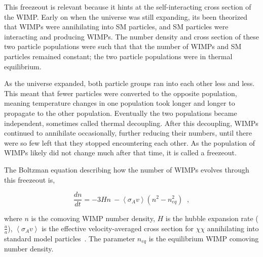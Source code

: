 This freezeout is relevant because it hints at the self-interacting cross section of the WIMP.
Early on when the universe was still expanding, its been theorized that WIMPs were annihilating into SM particles, and SM particles were interacting and producing WIMPs.
The number density and cross section of these two particle populations were such that that the number of WIMPs and SM particles remained constant; the two particle populations were in thermal equilibrium.

As the universe expanded, both particle groups ran into each other less and less.
This meant that fewer particles were converted to the opposite population, meaning temperature changes in one population took longer and longer to propagate to the other population.
Eventually the two populations became independent, sometimes called thermal decoupling.
After this decoupling, WIMPs continued to annihilate occasionally, further reducing their numbers, until there were so few left that they stopped encountering each other.
As the population of WIMPs likely did not change much after that time, it is called a freezeout.

The Boltzman equation describing how the number of WIMPs evolves through this freezeout is,

\begin{equation}\label{eqn:boltzmann_relic}
  \frac{dn}{dt} = - 3 H n \: - \left \langle \sigma_{A} v \right \rangle \left ( n^2 - n_{eq}^2 \right ) \;\;,
\end{equation}

where $n$ is the comoving WIMP number density, $H$ is the hubble expansion rate ($\frac{\dot{a}}{a}$), $\left \langle \sigma_{A} v \right \rangle$ is the effective velocity-averaged cross section for $\chi\chi$ annihilating into standard model particles~\cite{wells_relic}.
The parameter $n_{eq}$ is the equilibrium WIMP comoving number density.

